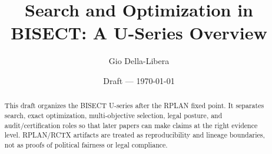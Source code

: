 \documentclass[12pt]{article}
\title{Search and Optimization in BISECT: A U-Series Overview}
\author{Gio Della-Libera}
\date{Draft --- \today}
\begin{document}
\maketitle

\begin{abstract}
This draft organizes the BISECT U-series after the RPLAN fixed point. It
separates search, exact optimization, multi-objective selection, legal posture,
and audit/certification roles so that later papers can make claims at the
right evidence level. RPLAN/RCTX artifacts are treated as reproducibility and
lineage boundaries, not as proofs of political fairness or legal compliance.
\end{abstract}








\nocite{bisect-u0-plan}


\end{document}
